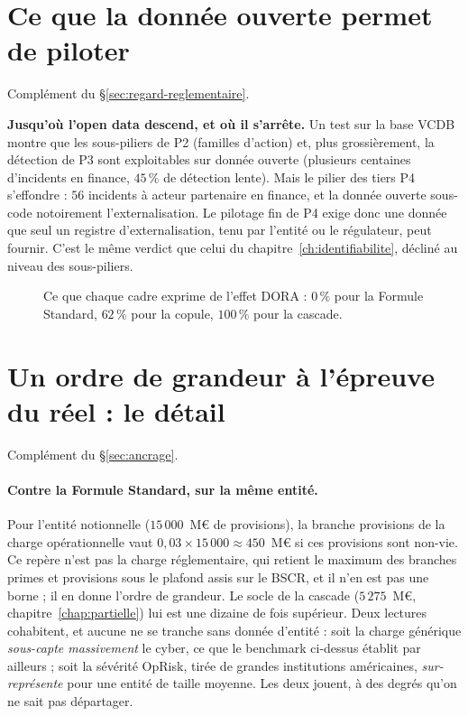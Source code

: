 \section{Ce que la donnée ouverte permet de piloter}
\label{sec:ann-regard-reglementaire}


Complément du \S\ref{sec:regard-reglementaire}.

\begin{cle}
\textbf{Jusqu'où l'open data descend, et où il s'arrête.} Un test sur
la base VCDB montre que les sous-piliers de P2 (familles d'action) et, plus grossièrement,
la détection de P3 sont exploitables sur donnée ouverte (plusieurs centaines d'incidents en
finance, $45\,\%$ de détection lente). Mais le pilier des tiers P4 s'effondre : $56$
incidents à acteur partenaire en finance, et la donnée ouverte sous-code notoirement
l'externalisation. Le pilotage fin de P4 exige donc une donnée que seul un registre
d'externalisation, tenu par l'entité ou le régulateur, peut fournir. C'est le même verdict
que celui du chapitre~\ref{ch:identifiabilite}, décliné au niveau des sous-piliers.
\end{cle}

\begin{figure}[htbp]\centering
{}
\caption{Ce que chaque cadre exprime de l'effet DORA : $0\,\%$ pour la Formule Standard,
$62\,\%$ pour la copule, $100\,\%$ pour la cascade.}
\label{fig:benchmark-sf}
\end{figure}

\section{Un ordre de grandeur à l'épreuve du réel : le détail}
\label{sec:ann-ancrage}


Complément du \S\ref{sec:ancrage}.

\paragraph{Contre la Formule Standard, sur la même entité.} Pour l'entité notionnelle
($15\,000$~M\euro{} de provisions), la branche provisions de la charge opérationnelle vaut
$0{,}03\times 15\,000 \approx 450$~M\euro{} si ces provisions sont non-vie. Ce repère n'est pas la
charge réglementaire, qui retient le maximum des branches primes et provisions sous le plafond
assis sur le BSCR, et il n'en est pas une borne ; il en donne l'ordre de grandeur. Le socle de la cascade
($5\,275$~M\euro, chapitre~\ref{chap:partielle}) lui est une dizaine de fois
supérieur. Deux lectures cohabitent, et aucune ne se tranche sans donnée d'entité : soit la
charge générique \emph{sous-capte massivement} le cyber, ce que le benchmark
ci-dessus établit par ailleurs ; soit la sévérité OpRisk, tirée de grandes institutions
américaines, \emph{sur-représente} pour une entité de taille moyenne. Les deux jouent, à des
degrés qu'on ne sait pas départager.

